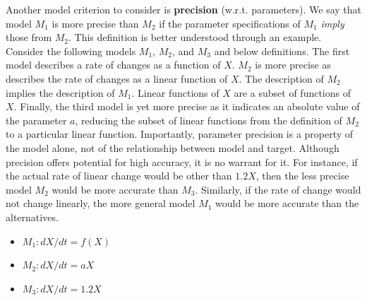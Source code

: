 \documentclass[
]{book}
\providecommand{\tightlist}{%
  \setlength{\itemsep}{0pt}\setlength{\parskip}{0pt}}
\begin{document}
Another model criterion to consider is \textbf{precision} (w.r.t. parameters). We say that model \(M_1\) is more precise than \(M_2\) if the parameter specifications of \(M_1\) \emph{imply} those from \(M_2\). This definition is better understood through an example. Consider the following models \(M_1\), \(M_2\), and \(M_3\) and below definitions. The first model describes a rate of changes as a function of \(X\). \(M_2\) is more precise as describes the rate of changes as a linear function of \(X\). The description of \(M_2\) implies the description of \(M_1\). Linear functions of \(X\) are a subset of functions of \(X\). Finally, the third model is yet more precise as it indicates an absolute value of the parameter \(a\), reducing the subset of linear functions from the definition of \(M_2\) to a particular linear function. Importantly, parameter precision is a property of the model alone, not of the relationship between model and target. Although precision offers potential for high accuracy, it is no warrant for it. For instance, if the actual rate of linear change would be other than \(1.2X\), then the less precise model \(M_2\) would be more accurate than \(M_3\). Similarly, if the rate of change would not change linearly, the more general model \(M_1\) would be more accurate than the alternatives.

\begin{itemize}
\tightlist
\item
  \(M_1: dX/dt = f(X)\)
\item
  \(M_2: dX/dt = aX\)
\item
  \(M_3: dX/dt = 1.2X\)
\end{itemize}
\end{document}
